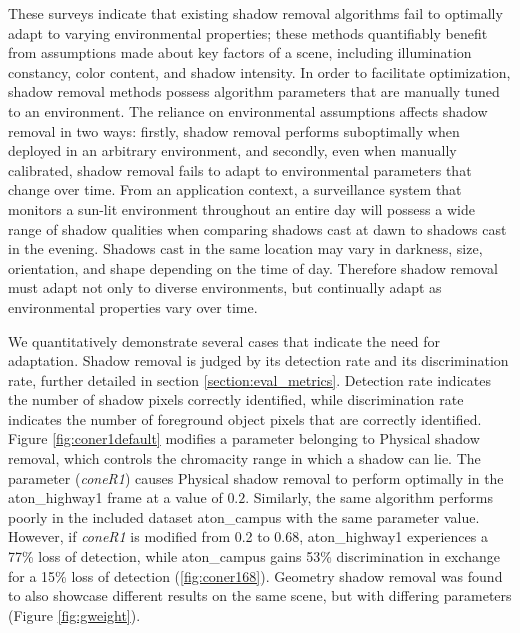 These surveys indicate that existing shadow removal algorithms fail to optimally adapt to varying environmental properties; these methods quantifiably benefit from assumptions made about key factors of a scene, including illumination constancy, color content, and shadow intensity. In order to facilitate optimization, shadow removal methods possess algorithm parameters that are manually tuned to an environment. The reliance on environmental assumptions affects shadow removal in two ways: firstly, shadow removal performs suboptimally when deployed in an arbitrary environment, and secondly, even when manually calibrated, shadow removal fails to adapt to environmental parameters that change over time. From an application context, a surveillance system that monitors a sun-lit environment throughout an entire day will possess a wide range of shadow qualities when comparing shadows cast at dawn to shadows cast in the evening. Shadows cast in the same location may vary in darkness, size, orientation, and shape depending on the time of day. Therefore shadow removal must adapt not only to diverse environments, but continually adapt as environmental properties vary over time.

We quantitatively demonstrate several cases that indicate the need for adaptation. Shadow removal is judged by its detection rate and its discrimination rate, further detailed in section \ref{section:eval_metrics}. Detection rate indicates the number of shadow pixels correctly identified, while discrimination rate indicates the number of foreground object pixels that are correctly identified. Figure \ref{fig:coner1default} modifies a parameter belonging to Physical shadow removal, which controls the chromacity range in which a shadow can lie. The parameter (\textit{coneR1}) causes Physical shadow removal to perform optimally in the aton\_highway1 frame at a value of $0.2$. Similarly, the same algorithm performs poorly in the included dataset aton\_campus with the same parameter value. However, if \textit{coneR1} is modified from 0.2 to 0.68, aton\_highway1 experiences a 77\% loss of detection, while aton\_campus gains 53\% discrimination in exchange for a 15\% loss of detection (\ref{fig:coner168}). Geometry shadow removal was found to also showcase different results on the same scene, but with differing parameters (Figure \ref{fig:gweight}). 


